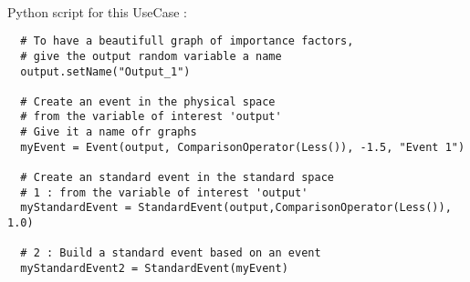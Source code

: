 \textspace\\
Python  script for this UseCase :

\begin{lstlisting}
  # To have a beautifull graph of importance factors,
  # give the output random variable a name
  output.setName("Output_1")

  # Create an event in the physical space
  # from the variable of interest 'output'
  # Give it a name ofr graphs
  myEvent = Event(output, ComparisonOperator(Less()), -1.5, "Event 1")

  # Create an standard event in the standard space
  # 1 : from the variable of interest 'output'
  myStandardEvent = StandardEvent(output,ComparisonOperator(Less()), 1.0)

  # 2 : Build a standard event based on an event
  myStandardEvent2 = StandardEvent(myEvent)
\end{lstlisting}


